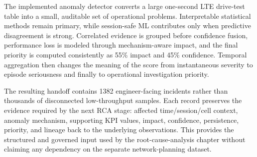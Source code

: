 The implemented anomaly detector converts a large one-second LTE drive-test table into a small, auditable set of operational problems. Interpretable statistical methods remain primary, while session-safe ML contributes only when predictive disagreement is strong. Correlated evidence is grouped before confidence fusion, performance loss is modeled through mechanism-aware impact, and the final priority is computed consistently as 55\% impact and 45\% confidence. Temporal aggregation then changes the meaning of the score from instantaneous severity to episode seriousness and finally to operational investigation priority.

The resulting handoff contains \num{1382} engineer-facing incidents rather than thousands of disconnected low-throughput samples. Each record preserves the evidence required by the next RCA stage: affected time/session/cell context, anomaly mechanism, supporting KPI values, impact, confidence, persistence, priority, and lineage back to the underlying observations. This provides the structured and governed input used by the root-cause-analysis chapter without claiming any dependency on the separate network-planning dataset.

\FloatBarrier
